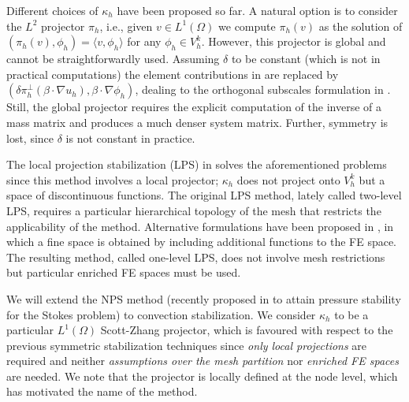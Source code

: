 
Different choices of $\kappa_h$ have been proposed so far. A natural option is to consider the $L^2$ projector $\pi_h$, i.e., given $v \in L^1(\Omega)$ we compute $\pi_h(v)$ as the solution of $(\pi_h(v),\phi_h) = \langle v, \phi_h\rangle$ for any $\phi_h \in V^k_h$. However, this projector is global and cannot be straightforwardly used. Assuming $\delta$ to be constant (which is not in practical computations) the element contributions in  are replaced by $ (\delta \pi_h^{\perp}( \beta \cdot \nabla u_h),  \beta \cdot \nabla \phi_h)$, dealing to the orthogonal subscales formulation in \cite{codina_stabilization_2000}. Still, the global projector requires the explicit computation of the inverse of a mass matrix and produces a much denser system matrix. %
Further, symmetry is lost, since $\delta$ is not constant in practice.

The local projection stabilization (LPS) in \cite{braack_local_2006} solves the aforementioned problems since this method involves a local projector; $\kappa_h$ does not project onto $V^k_h$ but a space of discontinuous functions. The original LPS method, lately called two-level LPS, requires a particular hierarchical topology of the mesh that restricts the applicability of the method. Alternative formulations have been proposed in \cite{matthies_unified_2007}, in which a fine space is obtained by including additional functions to the FE space. The resulting method, called one-level LPS, does not involve mesh restrictions but particular enriched FE spaces must be used.

We will extend the NPS method (recently proposed in \cite{badia_stabilized_2012} to attain pressure stability for the Stokes problem) to convection stabilization. We consider $\kappa_h$ to be a particular $L^1(\Omega)$ Scott-Zhang projector, which is favoured with respect to the previous symmetric stabilization techniques since \emph{only local projections} are required and neither \emph{assumptions over the mesh partition} nor \emph{enriched FE spaces} are needed. We note that the projector is locally defined at the node level, which has motivated the name of the method.


